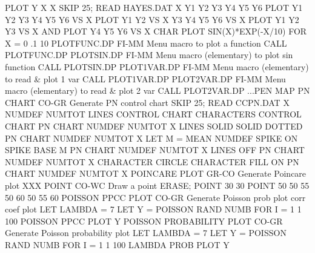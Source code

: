                                   PLOT Y X X
                                  SKIP 25; READ  HAYES.DAT X Y1 Y2 Y3 Y4 Y5 Y6
                                  PLOT Y1 Y2 Y3 Y4 Y5 Y6 VS X
                                  PLOT Y1 Y2 VS X Y3 Y4 Y5 Y6 VS X
                                  PLOT Y1 Y2 Y3 VS X AND
                                  PLOT Y4 Y5 Y6 VS X
                                  CHAR
                                  PLOT SIN(X)*EXP(-X/10) FOR X = 0 .1 10
PLOTFUNC.DP                 FI-MM Menu macro to plot a function
                                  CALL PLOTFUNC.DP
PLOTSIN.DP                  FI-MM Menu macro (elementary) to plot sin function
                                  CALL PLOTSIN.DP
PLOT1VAR.DP                 FI-MM Menu macro (elementary) to read & plot 1 var
                                  CALL PLOT1VAR.DP
PLOT2VAR.DP                 FI-MM Menu macro (elementary) to read & plot 2 var
                                  CALL PLOT2VAR.DP
...PEN MAP
PN CHART                    CO-GR Generate PN control chart
                                  SKIP 25; READ CCPN.DAT X NUMDEF NUMTOT
                                  LINES CONTROL CHART
                                  CHARACTERS CONTROL CHART
                                  PN CHART NUMDEF NUMTOT X
                                  LINES SOLID SOLID DOTTED
                                  PN CHART NUMDEF NUMTOT X
                                  LET M = MEAN NUMDEF
                                  SPIKE ON
                                  SPIKE BASE M
                                  PN CHART NUMDEF NUMTOT X
                                  LINES OFF
                                  PN CHART NUMDEF NUMTOT X
                                  CHARACTER CIRCLE
                                  CHARACTER FILL ON
                                  PN CHART NUMDEF NUMTOT X
POINCARE PLOT               GR-CO Generate Poincare plot
XXX
POINT                       CO-WC Draw a point
                                  ERASE; POINT 30 30
                                  POINT 50 50 55 50 60 50 55 60
POISSON PPCC PLOT           CO-GR Generate Poisson prob plot corr coef plot
                                  LET LAMBDA = 7
                                  LET Y = POISSON RAND NUMB FOR I = 1 1 100
                                  POISSON PPCC PLOT Y
POISSON PROBABILITY PLOT    CO-GR Generate Poisson probability plot
                                  LET LAMBDA = 7
                                  LET Y = POISSON RAND NUMB FOR I = 1 1 100
                                  LAMBDA PROB PLOT Y

